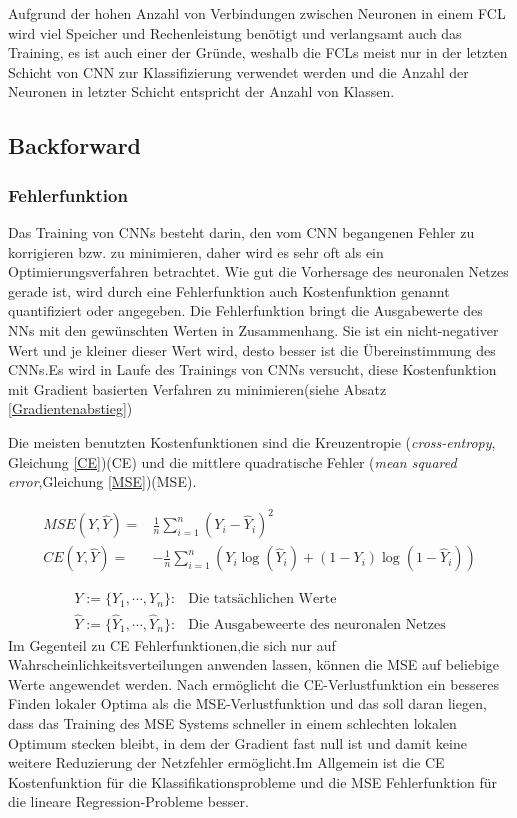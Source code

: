 \documentclass[12pt,a4paper]{scrartcl}
\numberwithin{equation}{section}
\begin{document}
Aufgrund der hohen Anzahl von Verbindungen zwischen Neuronen in einem \ac{FCL} wird viel Speicher und Rechenleistung benötigt und verlangsamt auch das Training, es ist auch einer der Gründe, weshalb die \acsp{FCL} meist nur in der letzten Schicht von \ac{CNN} zur Klassifizierung verwendet werden und die Anzahl der Neuronen in letzter Schicht entspricht der Anzahl von Klassen.



\subsection{Backforward }

\subsubsection{Fehlerfunktion}\label{Fehlerfunktion}

Das Training von \acsp{CNN} besteht darin, den vom \ac{CNN} begangenen Fehler zu korrigieren bzw. zu minimieren, daher wird es sehr oft als ein Optimierungsverfahren betrachtet.
Wie gut die Vorhersage des neuronalen Netzes gerade ist, wird durch eine Fehlerfunktion auch Kostenfunktion genannt quantifiziert oder angegeben.
Die Fehlerfunktion bringt die Ausgabewerte des \acsp{NN} mit den gewünschten Werten in Zusammenhang. Sie ist ein nicht-negativer Wert und je kleiner dieser Wert wird, desto besser ist die Übereinstimmung des \acsp{CNN}.Es wird in Laufe des Trainings von \acsp{CNN} versucht, diese Kostenfunktion mit Gradient basierten Verfahren zu minimieren(siehe Absatz \ref{Gradientenabstieg})


Die meisten benutzten Kostenfunktionen sind die Kreuzentropie (\textit{cross-entropy}, Gleichung \ref{CE})(CE) und die mittlere quadratische Fehler (\textit{mean squared error},Gleichung \ref{MSE})(MSE). 

\begin{align}
	\label{MSE}	
	MSE(Y, \widehat{Y}) =&\frac{1}{n}\sum_{i = 1}^{n}(Y_i - \widehat{Y}_i)^2\\
	\label{CE}
	CE(Y, \widehat{Y}) =&-\frac{1}{n}\sum_{i = 1}^{n}(Y_i\log(\widehat{Y}_i) +(1-Y_i)\log(1- \widehat{Y}_i))
\end{align}

\begin{align*}
Y:=\{Y_1,\cdots, Y_n\} :&\text{Die tatsächlichen Werte} \\
\widehat{Y}:=\{\widehat{Y}_1,\cdots, \widehat{Y}_n\} :&\text{Die Ausgabeweerte des neuronalen Netzes}
\end{align*}
Im Gegenteil zu CE Fehlerfunktionen,die sich nur auf Wahrscheinlichkeitsverteilungen anwenden lassen, können die MSE auf beliebige Werte angewendet werden. Nach \cite[Pavel et al]{7} ermöglicht die CE-Verlustfunktion ein besseres Finden lokaler Optima als die MSE-Verlustfunktion und das soll daran liegen, dass das Training des MSE Systems schneller in einem schlechten lokalen Optimum stecken bleibt, in dem der Gradient fast null ist und damit keine weitere Reduzierung der Netzfehler ermöglicht.Im Allgemein ist die CE Kostenfunktion für die Klassifikationsprobleme und die MSE Fehlerfunktion für die lineare Regression-Probleme besser.
\end{document}
